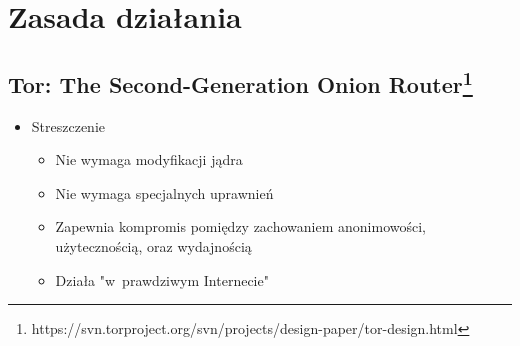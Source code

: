 \section{Zasada działania}

\subsection{Tor: The Second-Generation Onion Router\protect\footnote{https://svn.torproject.org/svn/projects/design-paper/tor-design.html}}
\begin{itemize}
  \item Streszczenie
  \begin{itemize}
   \item Nie wymaga modyfikacji jądra
   \item Nie wymaga specjalnych uprawnień
   \item Zapewnia kompromis pomiędzy zachowaniem anonimowości, użytecznością, oraz wydajnością
   \item Działa "w~prawdziwym Internecie"
  \end{itemize}


\end{itemize}
